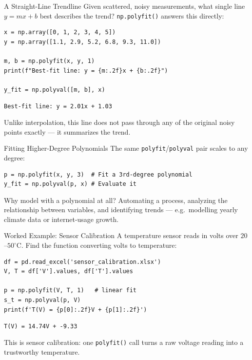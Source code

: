 \documentclass[9pt,aspectratio=169,xcolor=table]{beamer}
\begin{document}
\begin{frame}[fragile]{A Straight-Line Trendline}
    \leavevmode
    Given scattered, noisy measurements, what single line
    $y = mx + b$ best describes the trend? \texttt{np.polyfit()} answers
    this directly:

\begin{lstlisting}
x = np.array([0, 1, 2, 3, 4, 5])
y = np.array([1.1, 2.9, 5.2, 6.8, 9.3, 11.0])

m, b = np.polyfit(x, y, 1)
print(f"Best-fit line: y = {m:.2f}x + {b:.2f}")

y_fit = np.polyval([m, b], x)
\end{lstlisting}
    \texttt{Best-fit line: y = 2.01x + 1.03}

    \vspace{2mm}
    \small Unlike interpolation, this line does \alert{not} pass through
    any of the original noisy points exactly --- it summarizes the trend.
\end{frame}

\begin{frame}[fragile]{Fitting Higher-Degree Polynomials}
    \leavevmode
    The same \texttt{polyfit}/\texttt{polyval} pair scales to any degree:

\begin{lstlisting}
p = np.polyfit(x, y, 3)  # Fit a 3rd-degree polynomial
y_fit = np.polyval(p, x) # Evaluate it
\end{lstlisting}

    \vspace{2mm}
    \begin{block}{Why model with a polynomial at all?}
        \small Automating a process, analyzing the relationship between
        variables, and identifying trends --- e.g.\ modelling yearly
        climate data or internet-usage growth.
    \end{block}
\end{frame}

\begin{frame}[fragile]{Worked Example: Sensor Calibration}
    \leavevmode
    \small
    A temperature sensor reads in volts over $20$--$50^\circ$C. Find the
    function converting volts to temperature:

\begin{lstlisting}
df = pd.read_excel('sensor_calibration.xlsx')
V, T = df['V'].values, df['T'].values

p = np.polyfit(V, T, 1)   # linear fit
s_t = np.polyval(p, V)
print(f'T(V) = {p[0]:.2f}V + {p[1]:.2f}')
\end{lstlisting}
    \texttt{T(V) = 14.74V + -9.33}

    \vspace{2mm}
    \alert{This is sensor calibration}: one \texttt{polyfit()} call turns
    a raw voltage reading into a trustworthy temperature.
\end{frame}
\end{document}
